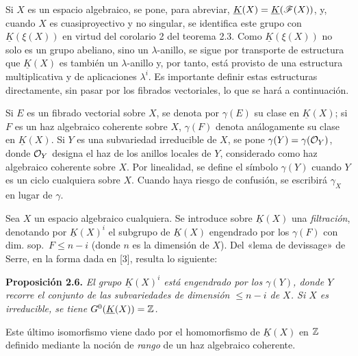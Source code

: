 Si $X$ es un espacio algebraico, se pone, para abreviar, $\underline{K}(X)=\underline{K}(\mathscr F(X))$, y, cuando $X$ es cuasiproyectivo y no singular, se identifica este grupo con $\underline{K}(\xi(X))$ en virtud del corolario 2 del teorema 2.3. Como $\underline{K}(\xi(X))$ no solo es un grupo abeliano, sino un $\lambda$-anillo, se sigue por transporte de estructura que $\underline{K}(X)$ es también un $\lambda$-anillo y, por tanto, está provisto de una estructura multiplicativa y de aplicaciones $\lambda^i$. Es importante definir estas estructuras directamente, sin pasar por los fibrados vectoriales, lo que se hará a continuación.

Si $E$ es un fibrado vectorial sobre $X$, se denota por $\gamma(E)$ su clase en $\underline{K}(X)$; si $F$ es un haz algebraico coherente sobre $X$, $\gamma(F)$ denota análogamente su clase en $\underline{K}(X)$. Si $Y$ es una subvariedad irreducible de $X$, se pone $\gamma(Y)=\gamma(\mathcal O_Y)$, donde $\mathcal O_Y$ designa el haz de los anillos locales de $Y$, considerado como haz algebraico coherente sobre $X$. Por linealidad, se define el símbolo $\gamma(Y)$ cuando $Y$ es un ciclo cualquiera sobre $X$. Cuando haya riesgo de confusión, se escribirá $\gamma_X$ en lugar de $\gamma$.

Sea $X$ un espacio algebraico cualquiera. Se introduce sobre $\underline{K}(X)$ una \emph{filtración}, denotando por $\underline{K}(X)^i$ el subgrupo de $\underline{K}(X)$ engendrado por los $\gamma(F)$ con dim. sop.\ $F\leq n-i$ (donde $n$ es la dimensión de $X$). Del «lema de devissage» de Serre, en la forma dada en [3], resulta lo siguiente:

\textbf{Proposición 2.6.} \emph{El grupo $\underline{K}(X)^i$ está engendrado por los $\gamma(Y)$, donde $Y$ recorre el conjunto de las subvariedades de dimensión $\leq n-i$ de $X$. Si $X$ es irreducible, se tiene $G^0(\underline{K}(X))=\mathbb Z$.}

Este último isomorfismo viene dado por el homomorfismo de $\underline{K}(X)$ en $\mathbb Z$ definido mediante la noción de \emph{rango} de un haz algebraico coherente.


